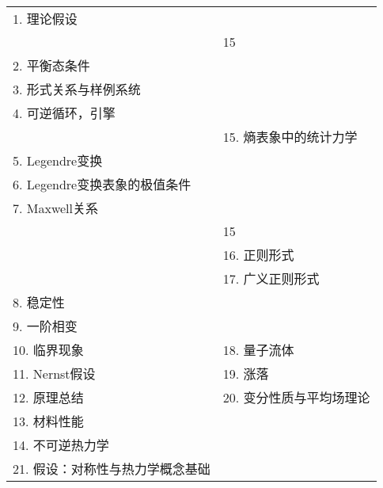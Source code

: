 \newpage
{{

\centering
\begin{tabular}{ll}
1. 理论假设 & \\
 & 15 \\
2. 平衡态条件 & \\
3. 形式关系与样例系统 & \\
4. 可逆循环，引擎 & \\
 & 15. 熵表象中的统计力学 \\
5. Legendre变换 & \\
6. Legendre变换表象的极值条件 & \\
7. Maxwell关系 & \\
 & 15 \\
 & 16. 正则形式 \\
 & 17. 广义正则形式 \\
8. 稳定性 & \\
9. 一阶相变 & \\
\hline
10. 临界现象 & 18. 量子流体 \\
11. Nernst假设 & 19. 涨落 \\
12. 原理总结 & 20. 变分性质与平均场理论 \\
13. 材料性能 & \\
14. 不可逆热力学 & \\
\hline
21. 假设：对称性与热力学概念基础
\end{tabular}
}}

